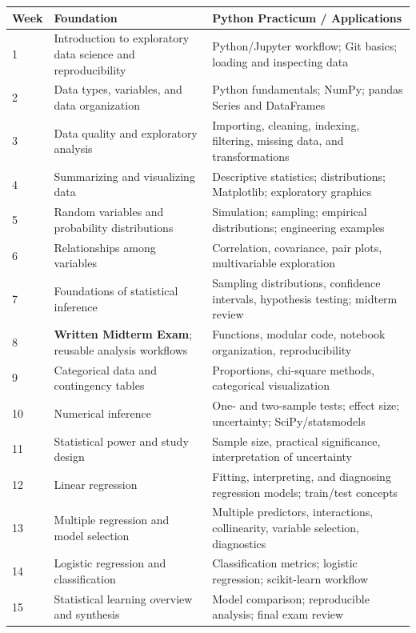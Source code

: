 \documentclass[11pt]{article}
\begin{document}
\begin{longtable}{@{}p{1.2cm}p{5.3cm}p{7.5cm}@{}}
\toprule
\textbf{Week} & \textbf{Foundation} & \textbf{Python Practicum / Applications}\\
\midrule
\endhead
1 & Introduction to exploratory data science and reproducibility & Python/Jupyter workflow; Git basics; loading and inspecting data\\
2 & Data types, variables, and data organization & Python fundamentals; NumPy; pandas Series and DataFrames\\
3 & Data quality and exploratory analysis & Importing, cleaning, indexing, filtering, missing data, and transformations\\
4 & Summarizing and visualizing data & Descriptive statistics; distributions; Matplotlib; exploratory graphics\\
5 & Random variables and probability distributions & Simulation; sampling; empirical distributions; engineering examples\\
6 & Relationships among variables & Correlation, covariance, pair plots, multivariable exploration\\
7 & Foundations of statistical inference & Sampling distributions, confidence intervals, hypothesis testing; midterm review\\
8 & \textbf{Written Midterm Exam}; reusable analysis workflows & Functions, modular code, notebook organization, reproducibility\\
9 & Categorical data and contingency tables & Proportions, chi-square methods, categorical visualization\\
10 & Numerical inference & One- and two-sample tests; effect size; uncertainty; SciPy/statsmodels\\
11 & Statistical power and study design & Sample size, practical significance, interpretation of uncertainty\\
12 & Linear regression & Fitting, interpreting, and diagnosing regression models; train/test concepts\\
13 & Multiple regression and model selection & Multiple predictors, interactions, collinearity, variable selection, diagnostics\\
14 & Logistic regression and classification & Classification metrics; logistic regression; scikit-learn workflow\\
15 & Statistical learning overview and synthesis & Model comparison; reproducible analysis; final exam review\\
\bottomrule
\end{longtable}
\end{document}
